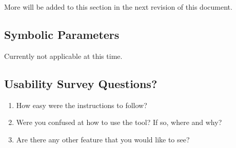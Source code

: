 \documentclass[12pt, titlepage]{article}
\begin{document}
More will be added to this section in the next revision of this document.

\subsection{Symbolic Parameters}
Currently not applicable at this time.

\subsection{Usability Survey Questions?}
\begin{enumerate}
\item How easy were the instructions to follow?

\item Were you confused at how to use the tool? If so, where and why?

\item Are there any other feature that you would like to see?

\end{enumerate}
\end{document}
